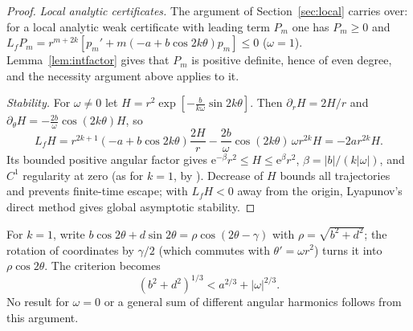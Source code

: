 \documentclass[11pt]{article}
\theoremstyle{remark}\newtheorem{remark}[theorem]{Remark}
\newcommand{\ee}{\mathrm e}
\begin{document}
\begin{proof}
\emph{Local analytic certificates.} The argument of Section~\ref{sec:local}
carries over: for a local analytic weak certificate with leading term
\(P_m\) one has \(P_m\ge0\) and
\(L_fP_m=r^{m+2k}[p_m'+m(-a+b\cos2k\theta)p_m]\le0\)
(\(\omega=1\)). Lemma~\ref{lem:intfactor} gives that \(P_m\) is
positive definite, hence of even degree, and the necessity argument above
applies to it.

\emph{Stability.} For \(\omega\ne0\) let
\(H=r^2\exp[-\frac{b}{k\omega}\sin2k\theta]\). Then
\(\partial_rH=2H/r\) and
\(\partial_\theta H=-\frac{2b}{\omega}\cos(2k\theta)H\), so
\[
 L_fH=r^{2k+1}(-a+b\cos2k\theta)\frac{2H}{r}
       -\frac{2b}{\omega}\cos(2k\theta)\,\omega r^{2k}H
      =-2ar^{2k}H.
\]
Its bounded positive angular factor gives \(\ee^{-\beta}r^2\le H\le\ee^{\beta}r^2\),
\(\beta=|b|/(k|\omega|)\), and \(C^1\) regularity at zero (as for
\(k=1\), by \cite[Lemma III.1]{liu}). Decrease of \(H\) bounds all
trajectories and prevents finite-time escape; with \(L_fH<0\) away from
the origin, Lyapunov's direct method gives global asymptotic stability.
\end{proof}

For \(k=1\), write
\(b\cos2\theta+d\sin2\theta=\rho\cos(2\theta-\gamma)\) with
\(\rho=\sqrt{b^2+d^2}\); the rotation of coordinates by \(\gamma/2\)
(which commutes with \(\theta'=\omega r^2\)) turns it into
\(\rho\cos2\theta\). The criterion becomes
\[
 (b^2+d^2)^{1/3}<a^{2/3}+|\omega|^{2/3}.
\]
No result for \(\omega=0\) or a general sum of different
angular harmonics follows from this argument.
\end{document}
